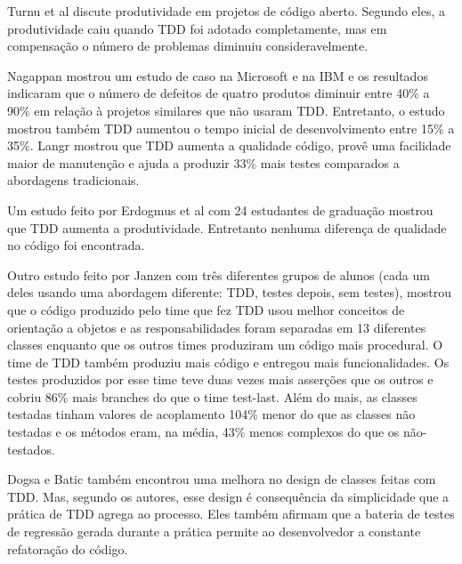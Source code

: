 Turnu et al \cite{turnu-tdd-opensouce} discute produtividade em
projetos de código aberto. Segundo eles, a produtividade caiu quando TDD foi
adotado completamente, mas em compensação o número de problemas diminuiu 
consideravelmente.

Nagappan \cite{nagappan-ms} mostrou um estudo de caso na Microsoft e na IBM e os
resultados indicaram que o número de defeitos de quatro produtos diminuir entre 
40\% a 90\% em relação à projetos similares que não usaram TDD. Entretanto, o 
estudo mostrou também TDD aumentou o tempo inicial de desenvolvimento entre 15\%
a 35\%. Langr \cite{langr} mostrou que TDD aumenta a qualidade código, provê uma 
facilidade maior de manutenção e ajuda a produzir 33\% mais testes comparados  a
abordagens tradicionais.

Um estudo feito por Erdogmus et al \cite{erdogmus-morisio} com 24 estudantes de
graduação mostrou que TDD aumenta a produtividade. Entretanto nenhuma diferença 
de qualidade no código foi encontrada.

Outro estudo feito por Janzen \cite{janzen-saiedian} com três diferentes grupos
de alunos (cada um deles usando uma abordagem diferente: TDD, testes depois, sem
testes), mostrou que o código produzido pelo time que fez TDD usou melhor
conceitos de orientação a objetos e as responsabilidades foram separadas em 13 
diferentes classes enquanto que os outros times produziram um código mais
procedural. O time de TDD também produziu mais código e entregou mais
funcionalidades. Os testes produzidos por esse time teve duas vezes mais
asserções que os outros e cobriu 86\% mais branches do que o time test-last. 
Além do mais, as classes testadas tinham valores de acoplamento 104\% menor do 
que as classes não testadas e os métodos eram, na média, 43\% menos complexos 
do que os não-testados.

Dogsa e Batic \cite{dogsa-batic} também encontrou uma melhora no
design de classes feitas com TDD. Mas, segundo os autores, esse design é 
consequência da simplicidade que a prática de TDD agrega ao processo. Eles
também  afirmam que a bateria de testes de regressão gerada durante a prática 
permite ao desenvolvedor a constante refatoração do código.

